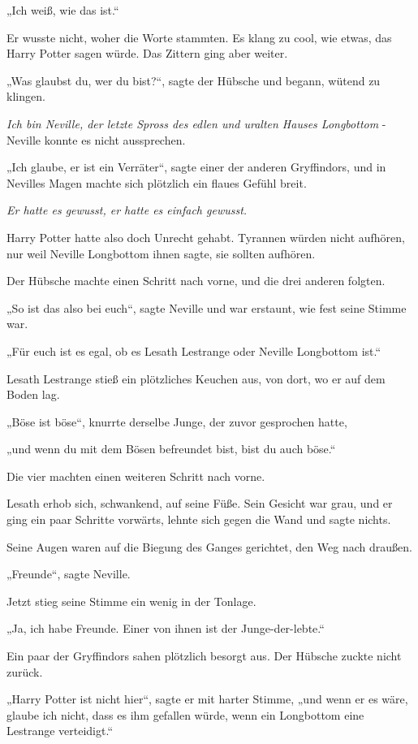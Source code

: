 {„Ich weiß, wie das ist.“

Er wusste nicht, woher die Worte stammten. Es klang zu cool, wie etwas, das Harry Potter sagen würde. Das Zittern ging aber weiter.

„Was glaubst du, wer du bist?“, sagte der Hübsche und begann, wütend zu klingen.

\emph{Ich bin Neville, der letzte Spross des edlen und uralten Hauses Longbottom} - Neville konnte es nicht aussprechen.

„Ich glaube, er ist ein Verräter“, sagte einer der anderen Gryffindors, und in Nevilles Magen machte sich plötzlich ein flaues Gefühl breit.

\emph{Er hatte es gewusst, er hatte es einfach gewusst.}

Harry Potter hatte also doch Unrecht gehabt. Tyrannen würden nicht aufhören, nur weil Neville Longbottom ihnen sagte, sie sollten aufhören.

Der Hübsche machte einen Schritt nach vorne, und die drei anderen folgten.

„So ist das also bei euch“, sagte Neville und war erstaunt, wie fest seine Stimme war.

„Für euch ist es egal, ob es Lesath Lestrange oder Neville Longbottom ist.“

Lesath Lestrange stieß ein plötzliches Keuchen aus, von dort, wo er auf dem Boden lag.

„Böse ist böse“, knurrte derselbe Junge, der zuvor gesprochen hatte,

„und wenn du mit dem Bösen befreundet bist, bist du auch böse.“

Die vier machten einen weiteren Schritt nach vorne.

Lesath erhob sich, schwankend, auf seine Füße. Sein Gesicht war grau, und er ging ein paar Schritte vorwärts, lehnte sich gegen die Wand und sagte nichts.

Seine Augen waren auf die Biegung des Ganges gerichtet, den Weg nach draußen.

„Freunde“, sagte Neville.

Jetzt stieg seine Stimme ein wenig in der Tonlage.

„Ja, ich habe Freunde. Einer von ihnen ist der Junge-der-lebte.“

Ein paar der Gryffindors sahen plötzlich besorgt aus. Der Hübsche zuckte nicht zurück.

„Harry Potter ist nicht hier“, sagte er mit harter Stimme, „und wenn er es wäre, glaube ich nicht, dass es ihm gefallen würde, wenn ein Longbottom eine Lestrange verteidigt.“

}
